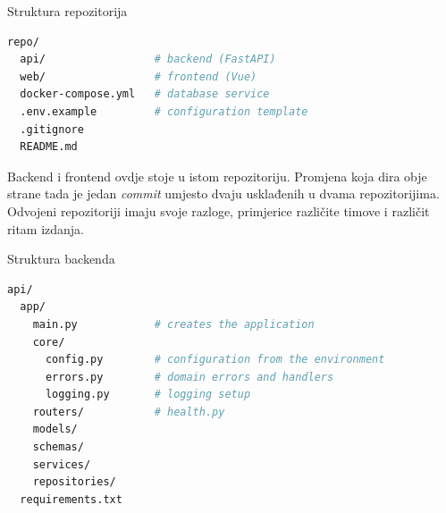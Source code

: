 \begin{frame}[fragile]{Struktura repozitorija}
\begin{lstlisting}[language=bash]
repo/
  api/                 # backend (FastAPI)
  web/                 # frontend (Vue)
  docker-compose.yml   # database service
  .env.example         # configuration template
  .gitignore
  README.md
\end{lstlisting}

\vspace{0.4em}
\begin{konvencija}
Backend i frontend ovdje stoje u istom repozitoriju. Promjena koja dira obje strane tada je jedan \emph{commit} umjesto dvaju usklađenih u dvama repozitorijima. Odvojeni repozitoriji imaju svoje razloge, primjerice različite timove i različit ritam izdanja.
\end{konvencija}
\end{frame}

\begin{frame}[fragile]{Struktura backenda}
\begin{lstlisting}[language=bash]
api/
  app/
    main.py            # creates the application
    core/
      config.py        # configuration from the environment
      errors.py        # domain errors and handlers
      logging.py       # logging setup
    routers/           # health.py
    models/
    schemas/
    services/
    repositories/
  requirements.txt
\end{lstlisting}

\end{frame}


